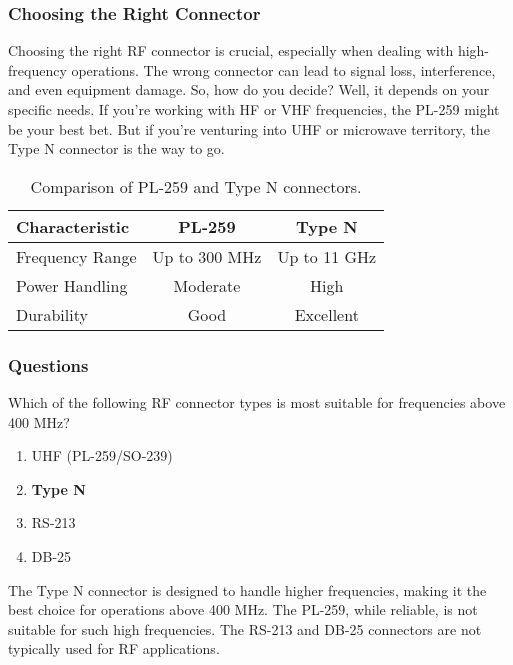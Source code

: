 \subsubsection*{Choosing the Right Connector}
Choosing the right RF connector is crucial, especially when dealing with high-frequency operations. The wrong connector can lead to signal loss, interference, and even equipment damage. So, how do you decide? Well, it depends on your specific needs. If you're working with HF or VHF frequencies, the PL-259 might be your best bet. But if you're venturing into UHF or microwave territory, the Type N connector is the way to go.

\begin{table}[h!]
    \centering
    \begin{tabular}{|l|c|c|}
        \hline
        \textbf{Characteristic} & \textbf{PL-259} & \textbf{Type N} \\
        \hline
        Frequency Range & Up to 300 MHz & Up to 11 GHz \\
        Power Handling & Moderate & High \\
        Durability & Good & Excellent \\
        \hline
    \end{tabular}
    \caption{Comparison of PL-259 and Type N connectors.}
    \label{tab:connector-comparison}
\end{table}

\subsubsection{Questions}

\begin{tcolorbox}[colback=gray!10!white,colframe=black!75!black,title={T9B06}]
    Which of the following RF connector types is most suitable for frequencies above 400 MHz?
    \begin{enumerate}[label=\Alph*),noitemsep]
        \item UHF (PL-259/SO-239)
        \item \textbf{Type N}
        \item RS-213
        \item DB-25
    \end{enumerate}
\end{tcolorbox}

The Type N connector is designed to handle higher frequencies, making it the best choice for operations above 400 MHz. The PL-259, while reliable, is not suitable for such high frequencies. The RS-213 and DB-25 connectors are not typically used for RF applications.


